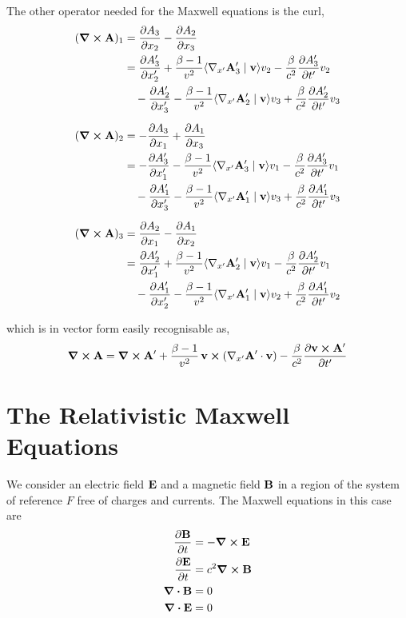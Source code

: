 \documentclass[12pt]{article}
\newcommand{\ip}[2]{\langle #1 \mid #2 \rangle}
\begin{document}
The other operator needed for the Maxwell equations is the curl,
\begin{equation}
  \begin{aligned}
    (\curl \vb{A})_1 &= \pdv{A_3}{x_2} - \pdv{A_2}{x_3} \\
      &= \pdv{A'_3}{x'_2}
        + \frac{\beta-1}{v^2}\ip{\nabla_{x'}\vb{A}'_3}{\vb{v}}v_2
        - \frac{\beta}{c^2}\pdv{A'_3}{t'}v_2 \\
      &\quad - \pdv{A'_2}{x'_3}
        - \frac{\beta-1}{v^2}\ip{\nabla_{x'}\vb{A}'_2}{\vb{v}}v_3
        + \frac{\beta}{c^2}\pdv{A'_2}{t'}v_3 \\[6pt]
    (\curl \vb{A})_2 &= -\pdv{A_3}{x_1} + \pdv{A_1}{x_3} \\
      &= -\pdv{A'_3}{x'_1}
        - \frac{\beta-1}{v^2}\ip{\nabla_{x'}\vb{A}'_3}{\vb{v}}v_1
        - \frac{\beta}{c^2}\pdv{A'_3}{t'}v_1 \\
      &\quad - \pdv{A'_1}{x'_3}
        - \frac{\beta-1}{v^2}\ip{\nabla_{x'}\vb{A}'_1}{\vb{v}}v_3
        + \frac{\beta}{c^2}\pdv{A'_1}{t'}v_3 \\[6pt]
    (\curl \vb{A})_3 &= \pdv{A_2}{x_1} - \pdv{A_1}{x_2} \\
      &= \pdv{A'_2}{x'_1}
        + \frac{\beta-1}{v^2}\ip{\nabla_{x'}\vb{A}'_2}{\vb{v}}v_1
        - \frac{\beta}{c^2}\pdv{A'_2}{t'}v_1 \\
      &\quad - \pdv{A'_1}{x'_2}
        - \frac{\beta-1}{v^2}\ip{\nabla_{x'}\vb{A}'_1}{\vb{v}}v_2
        + \frac{\beta}{c^2}\pdv{A'_1}{t'}v_2
  \end{aligned}
\end{equation}

which is in vector form easily recognisable as,
\begin{equation}
  \curl \vb{A} = \curl \vb{A}'
    + \frac{\beta-1}{v^2}\,\vb{v} \cross (\nabla_{x'}\vb{A}' \cdot \vb{v})
    - \frac{\beta}{c^2}\pdv{\vb{v} \cross \vb{A}'}{t'}
  \label{eq:curl_in_F}
\end{equation}

\section{The Relativistic Maxwell Equations}

We consider an electric field $\vb{E}$ and a magnetic field $\vb{B}$ in a region of the
system of reference $F$ free of charges and currents. The Maxwell equations in this case are
\begin{align}
  \pdv{\vb{B}}{t} &= -\curl \vb{E} \nonumber \\
  \pdv{\vb{E}}{t} &= c^2 \curl \vb{B} \nonumber \\
  \div \vb{B}     &= 0                \nonumber \\
  \div \vb{E}     &= 0
  \label{eq:maxwell_in_F}
\end{align}
\end{document}
